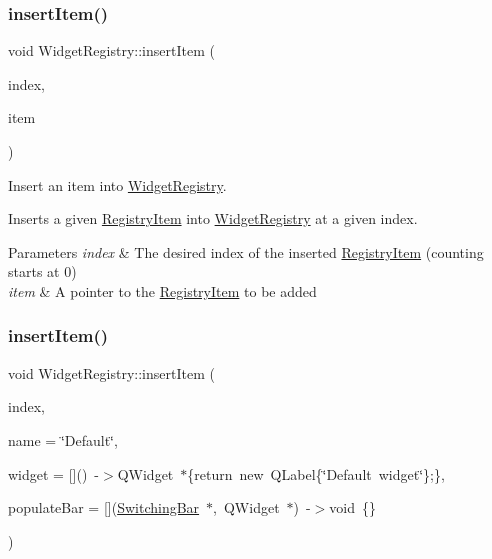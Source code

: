 \subsubsection{\texorpdfstring{insert\+Item()}{insertItem()}\hspace{0.1cm}{\footnotesize\ttfamily [1/2]}}
{\footnotesize\ttfamily void Widget\+Registry\+::insert\+Item (\begin{DoxyParamCaption}\item[{int}]{index,  }\item[{\hyperlink{class_registry_item}{Registry\+Item} $\ast$}]{item }\end{DoxyParamCaption})}



Insert an item into \hyperlink{class_widget_registry}{Widget\+Registry}. 

Inserts a given \hyperlink{class_registry_item}{Registry\+Item} into \hyperlink{class_widget_registry}{Widget\+Registry} at a given index. 
\begin{DoxyParams}{Parameters}
{\em index} & The desired index of the inserted \hyperlink{class_registry_item}{Registry\+Item} (counting starts at 0) \\
\hline
{\em item} & A pointer to the \hyperlink{class_registry_item}{Registry\+Item} to be added \\
\hline
\end{DoxyParams}
\hypertarget{class_widget_registry_ac39d282b5e1639e3e9a3e0dfdae8e92e}{}\label{class_widget_registry_ac39d282b5e1639e3e9a3e0dfdae8e92e} 
\subsubsection{\texorpdfstring{insert\+Item()}{insertItem()}\hspace{0.1cm}{\footnotesize\ttfamily [2/2]}}
{\footnotesize\ttfamily void Widget\+Registry\+::insert\+Item (\begin{DoxyParamCaption}\item[{int}]{index,  }\item[{Q\+String}]{name = {\ttfamily \char`\"{}Default\char`\"{}},  }\item[{Q\+Widget $\ast$($\ast$)()}]{widget = {\ttfamily \mbox{[}\mbox{]}()~-\/$>$QWidget~$\ast$\{return~new~QLabel\{\char`\"{}Default~widget\char`\"{}\};\}},  }\item[{void($\ast$)(\hyperlink{class_switching_bar}{Switching\+Bar} $\ast$, Q\+Widget $\ast$)}]{populate\+Bar = {\ttfamily \mbox{[}\mbox{]}(\hyperlink{class_switching_bar}{Switching\+Bar}~$\ast$,~QWidget~$\ast$)~-\/$>$void~\{\}} }\end{DoxyParamCaption})}



